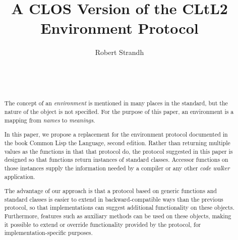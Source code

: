 \documentclass{acm_proc_article-sp}
\begin{document}
\title{A CLOS Version of the CLtL2 Environment Protocol}
\author{\alignauthor
Robert Strandh\\
\\
\\
\\
}


\maketitle

\begin{abstract}
The concept of an \emph{environment} is mentioned in many places in
the \commonlisp{} standard, but the nature of the object is not
specified.  For the purpose of this paper, an environment is a mapping
from \emph{names} to \emph{meanings}.

In this paper, we propose a replacement for the environment protocol
documented in the book Common Lisp the Language, second edition.
Rather than returning multiple values as the functions in that that
protocol do, the protocol suggested in this paper is designed so that
functions return instances of standard classes.  Accessor functions on
those instances supply the information needed by a compiler or any
other \emph{code walker} application.

The advantage of our approach is that a protocol based on generic
functions and standard classes is easier to extend in
backward-compatible ways than the previous protocol, so that
implementations can suggest additional functionality on these objects.
Furthermore, \clos{} features such as auxiliary methods can be used on
these objects, making it possible to extend or override functionality
provided by the protocol, for implementation-specific purposes.
\end{abstract}
\end{document}
